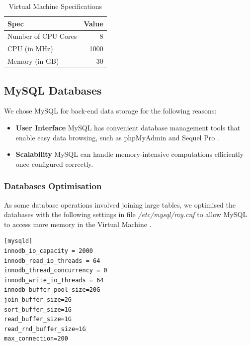 \begin{table}
\centering
\begin{tabular}{@{}lr@{}} \toprule
Spec & Value \\ \midrule
Number of CPU Cores & 8 \\
CPU (in MHz) & 1000 \\
Memory (in GB) & 30 \\
 \bottomrule
\end{tabular}
\caption{Virtual Machine Specifications}
\label{table:virtual_machine}
\end{table}

\subsection{MySQL Databases}
\par We chose MySQL for back-end data storage for the following reasons:

\begin{itemize}
  \item \textbf{User Interface} MySQL has convenient database management tools that enable easy data browsing, such as phpMyAdmin\cite{phpmyadmin} and Sequel Pro \cite{sequel_pro}.
  \item \textbf{Scalability} MySQL can handle memory-intensive computations efficiently once configured correctly.
\end{itemize}

\subsubsection{Databases Optimisation}
\par As some database operations involved joining large tables, we optimised the databases with the following settings in file \textit{/etc/mysql/my.cnf} to allow MySQL to access more memory in the Virtual Machine \cite{setting_innodb_buffer_pool_size,innodb_buffer}.

\begin{verbatim}
[mysqld]
innodb_io_capacity = 2000
innodb_read_io_threads = 64
innodb_thread_concurrency = 0
innodb_write_io_threads = 64
innodb_buffer_pool_size=20G
join_buffer_size=2G
sort_buffer_size=1G
read_buffer_size=1G
read_rnd_buffer_size=1G
max_connection=200
\end{verbatim}


